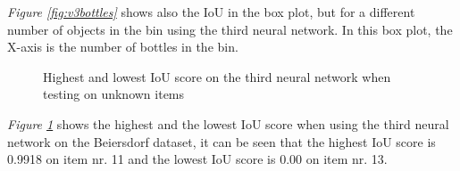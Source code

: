 \textit{Figure \ref{fig:v3bottles}} shows also the IoU in the box plot, but for a different number of objects in the bin using the third neural network. In this box plot, the X-axis is the number of bottles in the bin. %
\clearpage
\begin{figure}[h]
 \centering
 \hfill
 
 \caption{Highest and lowest IoU score on the third neural network when testing on unknown items}
 \label{fig:v3unknowniou2}
\end{figure}


\textit{Figure \ref{fig:v3unknowniou2}} shows the highest and the lowest IoU score when using the third neural network on the Beiersdorf dataset, it can be seen that the highest IoU score is 0.9918 on item nr. 11 and the lowest IoU score is 0.00 on item nr. 13.

